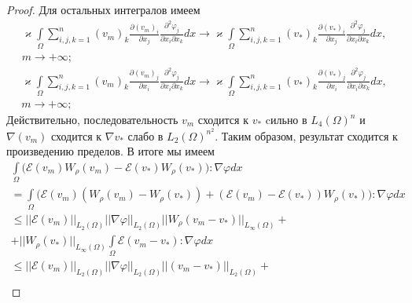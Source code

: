 \begin{proof}
    Для остальных интегралов имеем
    \begin{equation*}
        \begin{gathered}
            \varkappa \int\limits_{\Omega}\sum_{i,j,k=1}^n (v_m)_k
            \frac{\partial (v_m)_i}{\partial x_j} \frac{\partial^2 \varphi_j}{\partial x_i \partial x_k} dx \rightarrow
            \varkappa \int\limits_{\Omega}\sum_{i,j,k=1}^n (v_*)_k
            \frac{\partial (v_*)_i}{\partial x_j} \frac{\partial^2 \varphi_j}{\partial x_i \partial x_k} dx,\\
            m \rightarrow +\infty;
        \end{gathered}
    \end{equation*}
    \begin{equation*}
        \begin{gathered}
            \varkappa \int\limits_{\Omega}\sum_{i,j,k=1}^n (v_m)_k
            \frac{\partial (v_m)_j}{\partial x_i} \frac{\partial^2 \varphi_j}{\partial x_i \partial x_k} dx \rightarrow
            \varkappa \int\limits_{\Omega}\sum_{i,j,k=1}^n (v_*)_k
            \frac{\partial (v_*)_j}{\partial x_i} \frac{\partial^2 \varphi_j}{\partial x_i \partial x_k} dx,\\
            m \rightarrow +\infty;
        \end{gathered}
    \end{equation*}
    Действительно, последовательность $v_m$ сходится к $v_*$ cильно в $L_4(\Omega)^n$
    и $\nabla(v_m)$ сходится к $\nabla v_*$ слабо в $L_2(\Omega)^{n^2}$.
    Таким образом, результат сходится к произведению пределов. В итоге мы имеем
    \begin{equation*}
        \begin{gathered}
            \int\limits_{\Omega} \bigg(\mathcal{E}(v_m)W_\rho (v_m) - \mathcal{E}(v_*)W_\rho(v_*)\bigg): \nabla\varphi dx\\
            = \int\limits_{\Omega} \bigg(\mathcal{E}(v_m)(W_\rho (v_m) - W_\rho(v_*))
            + (\mathcal{E}(v_m) - \mathcal{E}(v_*))W_\rho (v_*)\bigg): \nabla\varphi dx\\
            \leq ||\mathcal{E}(v_m)||_{L_2(\Omega)}||\nabla\varphi||_{L_2(\Omega)}||W_\rho(v_m - v_*)||_{L_\infty(\Omega)} +\\
            + ||W_\rho(v_*)||_{L_\infty(\Omega)} \int\limits_{\Omega}\mathcal{E}(v_m - v_*): \nabla\varphi dx\\
            \leq ||\mathcal{E}(v_m)||_{L_2(\Omega)}||\nabla\varphi||_{L_2(\Omega)}||(v_m - v_*)||_{L_2(\Omega)} +\\

\end{gathered}
\end{equation*}
\end{proof}
